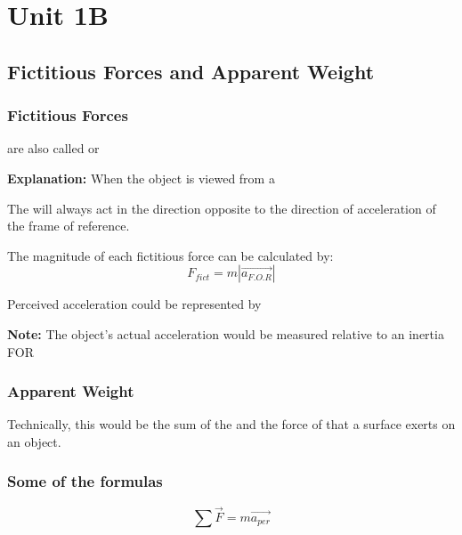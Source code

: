 \chapter{Unit 1B}

\section{Fictitious Forces and Apparent Weight}
\subsection{Fictitious Forces}
 are also called  or 

\begin{redblock}
    \textbf{Explanation:} When the object is viewed from a 
\end{redblock}

The  will always act in the direction opposite to the direction of acceleration of 
the frame of reference.\\

\begin{cyanblock}
    The magnitude of each fictitious force can be calculated by:
    \[
        F_{fict} = m|\vec{a_{F.O.R}}|
    \]
\end{cyanblock}

Perceived acceleration could be represented by 

\begin{redblock}
    \textbf{Note: } The object's actual acceleration would be measured relative to an inertia FOR
\end{redblock}

\subsection{Apparent Weight}
Technically, this would be the sum of the  and the force of  that a surface exerts 
on an object. 

\subsection{Some of the formulas}
\[
    \sum \vec{F} = m\vec{a_{per}}
\]